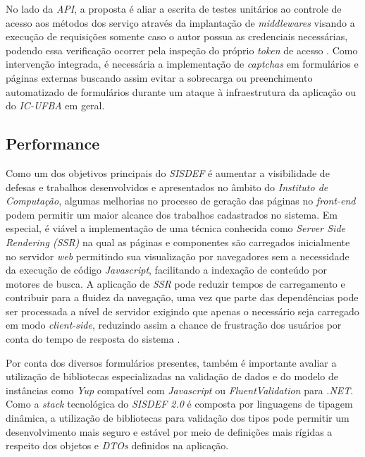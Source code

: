 \documentclass[nonacm, sigconf]{acmart}
\begin{document}
No lado da \textit{API}, a proposta é aliar a escrita de testes unitários ao controle de acesso aos métodos dos serviço através da implantação de \textit{middlewares} visando a execução de requisições somente caso o autor possua as credenciais necessárias, podendo essa verificação ocorrer pela inspeção do próprio \textit{token} de acesso \cite{peyrott2016jwt}. Como intervenção integrada, é necessária a implementação de \textit{captchas} em formulários e páginas externas buscando assim evitar a sobrecarga ou preenchimento automatizado de formulários durante um ataque à infraestrutura da aplicação ou do \textit{IC-UFBA} em geral.

\subsection{Performance}

Como um dos objetivos principais do \textit{SISDEF} é aumentar a visibilidade de defesas e trabalhos desenvolvidos e apresentados no âmbito do \textit{Instituto de Computação}, algumas melhorias no processo de geração das páginas no \textit{front-end} podem permitir um maior alcance dos trabalhos cadastrados no sistema. Em especial, é viável a implementação de uma técnica conhecida como \textit{Server Side Rendering (SSR)} na qual as páginas e componentes são carregados inicialmente no servidor \textit{web} permitindo sua visualização por navegadores sem a necessidade da execução de código \textit{Javascript}, facilitando a indexação de conteúdo por motores de busca. A aplicação de \textit{SSR} pode reduzir tempos de carregamento e contribuir para a fluidez da navegação, uma vez que parte das dependências pode ser processada a nível de servidor exigindo que apenas o necessário seja carregado em modo \textit{client-side}, reduzindo assim a chance de frustração dos usuários por conta do tempo de resposta do sistema \cite{ampofo2020challenges}.

Por conta dos diversos formulários presentes, também é importante avaliar a utilização de bibliotecas especializadas na validação de dados e do modelo de instâncias como \textit{Yup} compatível com \textit{Javascript} ou \textit{FluentValidation} para \textit{.NET}. Como a \textit{stack} tecnológica do \textit{SISDEF 2.0} é composta por linguagens de tipagem dinâmica, a utilização de bibliotecas para validação dos tipos pode permitir um desenvolvimento mais seguro e estável por meio de definições mais rígidas a respeito dos objetos e \textit{DTOs} definidos na aplicação.
\end{document}
